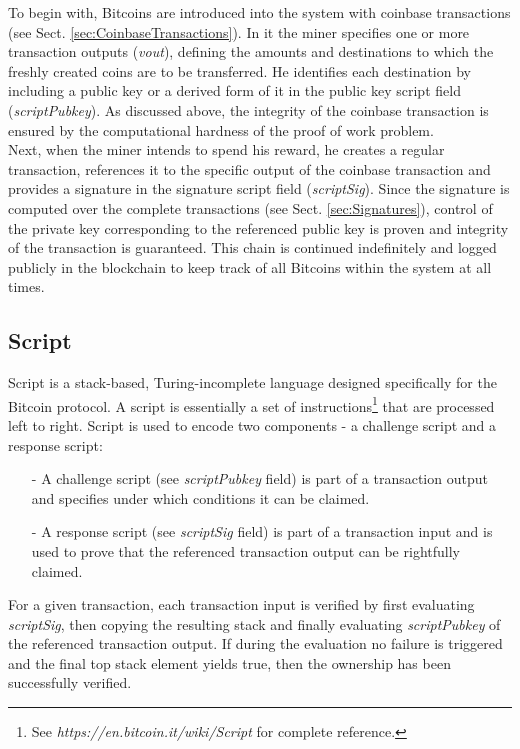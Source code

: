 \noindent
To begin with, Bitcoins are introduced into the system with coinbase transactions (see Sect. \ref{sec:CoinbaseTransactions}). In it the miner specifies one or more transaction outputs (\textit{vout}), defining the amounts and destinations to which the freshly created coins are to be transferred. He identifies each destination by including a public key or a derived form of it in the public key script field (\textit{scriptPubkey}). As discussed above, the integrity of the coinbase transaction is ensured by the computational hardness of the proof of work problem.~\\

\noindent
Next, when the miner intends to spend his reward, he creates a regular transaction, references it to the specific output of the coinbase transaction and provides a signature in the signature script field (\textit{scriptSig}). Since the signature is computed over the complete transactions (see Sect. \ref{sec:Signatures}), control of the private key corresponding to the referenced public key is proven and integrity of the transaction is guaranteed. This chain is continued indefinitely and logged publicly in the blockchain to keep track of all Bitcoins within the system at all times.


\subsection{Script} \label{sec:Script}
Script is a stack-based, Turing-incomplete language designed specifically for the Bitcoin protocol. A script is essentially a set of instructions\footnote{See \textit{https://en.bitcoin.it/wiki/Script} for complete reference.} that are processed left to right. Script is used to encode two components - a challenge script and a response script:

\begin{itemize}
\item[-] A challenge script (see \textit{scriptPubkey} field) is part of a transaction output and specifies under which conditions it can be claimed.
\item[-] A response script (see \textit{scriptSig} field) is part of a transaction input and is used to prove that the referenced transaction output can be rightfully claimed.
\end{itemize}

\noindent
For a given transaction, each transaction input is verified by first evaluating \textit{scriptSig}, then copying the resulting stack and finally evaluating \textit{scriptPubkey} of the referenced transaction output. If during the evaluation no failure is triggered and the final top stack element yields true, then the ownership has been successfully verified.~\\

